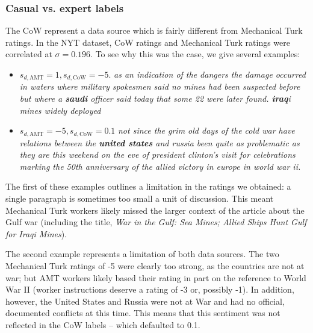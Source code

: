 \subsubsection{Casual vs. expert labels}
The CoW represent a data source which is fairly different from
Mechanical Turk ratings. In the NYT dataset, CoW ratings and
Mechanical Turk ratings were correlated at $\sigma=0.196$.  To
see why this was the case, we give several examples:
\begin{itemize}
  \item $s_{d,\mbox{AMT}} = 1, s_{d,\mbox{CoW}}=-5$. \emph{as an
    indication of the dangers the damage occurred in waters where
    military spokesmen said no mines had been suspected before but
    where a \textbf{saudi} officer said today that some 22 were later
    found. \textbf{iraq}i mines widely deployed} \cite{cushman:1991}
  \item $s_{d,\mbox{AMT}} = -5, s_{d,\mbox{CoW}}=0.1$ \emph{not since
    the grim old days of the cold war have relations between the
    \textbf{united states} and russia been quite as problematic as they
    are this weekend on the eve of president clinton's visit for
    celebrations marking the 50th anniversary of the allied victory in
    europe in world war ii.} \cite{apple:1995}
\end{itemize}

The first of these examples outlines a limitation in the ratings we
obtained: a single paragraph is sometimes too small a unit of
discussion.  This meant Mechanical Turk workers likely missed the
larger context of the article about the Gulf war (including the title,
\emph{War in the Gulf: Sea Mines; Allied Ships Hunt Gulf for Iraqi
  Mines}).

The second example represents a limitation of both data sources.  The
two Mechanical Turk ratings of -5 were clearly too strong, as the
countries are not at war; but AMT workers likely based their rating in
part on the reference to World War II (worker instructions deserve a
rating of -3 or, possibly -1).  In addition, however, the United
States and Russia were not at War and had no official, documented
conflicts at this time.  This means that this sentiment was not
reflected in the CoW labels -- which defaulted to 0.1.

\label{section:experiments}

